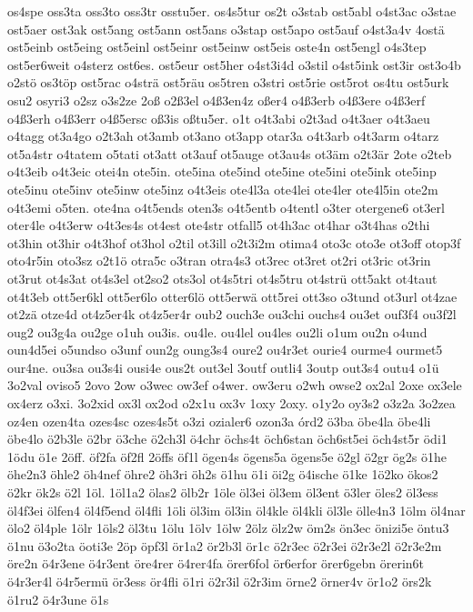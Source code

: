 {os4spe
oss3ta
oss3to
oss3tr
osstu5er.
os4s5tur
os2t
o3stab
ost5abl
o4st3ac
o3stae
ost5aer
ost3ak
ost5ang
ost5ann
ost5ans
o3stap
ost5apo
ost5auf
o4st3a4v
4ostä
ost5einb
ost5eing
ost5einl
ost5einr
ost5einw
ost5eis
oste4n
ost5engl
o4s3tep
ost5er6weit
o4sterz
ost6es.
ost5eur
ost5her
o4st3i4d
o3stil
o4st5ink
ost3ir
ost3o4b
o2stö
os3töp
ost5rac
o4strä
ost5räu
os5tren
o3stri
ost5rie
ost5rot
os4tu
ost5urk
osu2
osyri3
o2sz
o3s2ze
2oß
o2ß3el
o4ß3en4z
oßer4
o4ß3erb
o4ß3ere
o4ß3erf
o4ß3erh
o4ß3err
o4ß5ersc
oß3is
oßtu5er.
o1t
o4t3abi
o2t3ad
o4t3aer
o4t3aeu
o4tagg
ot3a4go
o2t3ah
ot3amb
ot3ano
ot3app
otar3a
o4t3arb
o4t3arm
o4tarz
ot5a4str
o4tatem
o5tati
ot3att
ot3auf
ot5auge
ot3au4s
ot3äm
o2t3är
2ote
o2teb
o4t3eib
o4t3eic
otei4n
ote5in.
ote5ina
ote5ind
ote5ine
ote5ini
ote5ink
ote5inp
ote5inu
ote5inv
ote5inw
ote5inz
o4t3eis
ote4l3a
ote4lei
ote4ler
ote4l5in
ote2m
o4t3emi
o5ten.
ote4na
o4t5ends
oten3s
o4t5entb
o4tentl
o3ter
otergene6
ot3erl
oter4le
o4t3erw
o4t3es4s
ot4est
ote4str
otfall5
ot4h3ac
ot4har
o3t4has
o2thi
ot3hin
ot3hir
o4t3hof
ot3hol
o2til
ot3ill
o2t3i2m
otima4
oto3c
oto3e
ot3off
otop3f
oto4r5in
oto3sz
o2t1ö
otra5c
o3tran
otra4s3
ot3rec
ot3ret
ot2ri
ot3ric
ot3rin
ot3rut
ot4s3at
ot4s3el
ot2so2
ots3ol
ot4s5tri
ot4s5tru
ot4strü
ott5akt
ot4taut
ot4t3eb
ott5er6kl
ott5er6lo
otter6lö
ott5erwä
ott5rei
ott3so
o3tund
ot3url
ot4zae
ot2zä
otze4d
ot4z5er4k
ot4z5er4r
oub2
ouch3e
ou3chi
ouchs4
ou3et
ouf3f4
ou3f2l
oug2
ou3g4a
ou2ge
o1uh
ou3is.
ou4le.
ou4lel
ou4les
ou2li
o1um
ou2n
o4und
oun4d5ei
o5undso
o3unf
oun2g
oung3s4
oure2
ou4r3et
ourie4
ourme4
ourmet5
our4ne.
ou3sa
ou3s4i
ousi4e
ous2t
out3el
3outf
outli4
3outp
out3s4
outu4
o1ü
3o2val
oviso5
2ovo
2ow
o3wec
ow3ef
o4wer.
ow3eru
o2wh
owse2
ox2al
2oxe
ox3ele
ox4erz
o3xi.
3o2xid
ox3l
ox2od
o2x1u
ox3v
1oxy
2oxy.
o1y2o
oy3s2
o3z2a
3o2zea
oz4en
ozen4ta
ozes4sc
ozes4s5t
o3zi
ozialer6
ozon3a
órd2
ö3ba
öbe4la
öbe4li
öbe4lo
ö2b3le
ö2br
ö3che
ö2ch3l
ö4chr
öchs4t
öch6stan
öch6st5ei
öch4st5r
ödi1
1ödu
ö1e
2öff.
öf2fa
öf2fl
2öffs
öf1l
ögen4s
ögens5a
ögens5e
ö2gl
ö2gr
ög2s
ö1he
öhe2n3
öhle2
öh4nef
öhre2
öh3ri
öh2s
ö1hu
ö1i
öi2g
ö4ische
ö1ke
1ö2ko
ökos2
ö2kr
ök2s
ö2l
1öl.
1öl1a2
ölas2
ölb2r
1öle
öl3ei
öl3em
öl3ent
ö3ler
öles2
öl3ess
öl4f3ei
ölfen4
öl4f5end
öl4fli
1öli
öl3im
öl3in
öl4kle
öl4kli
öl3le
ölle4n3
1ölm
öl4nar
ölo2
öl4ple
1ölr
1öls2
öl3tu
1ölu
1ölv
1ölw
2ölz
ölz2w
öm2s
ön3ec
önizi5e
öntu3
ö1nu
ö3o2ta
öoti3e
2öp
öpf3l
ör1a2
ör2b3l
ör1c
ö2r3ec
ö2r3ei
ö2r3e2l
ö2r3e2m
öre2n
ö4r3ene
ö4r3ent
öre4rer
ö4rer4fa
örer6fol
ör6erfor
örer6gebn
örerin6t
ö4r3er4l
ö4r5ermü
ör3ess
ör4fli
ö1ri
ö2r3il
ö2r3im
örne2
örner4v
ör1o2
örs2k
ö1ru2
ö4r3une
ö1s
}
